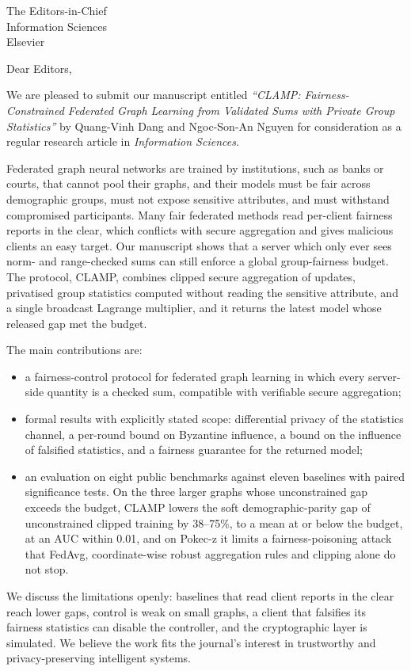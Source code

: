 \documentclass[11pt]{letter}
\date{31 October 2026}
\begin{document}
\begin{letter}{The Editors-in-Chief\\Information Sciences\\Elsevier}

\opening{Dear Editors,}

We are pleased to submit our manuscript entitled \emph{``CLAMP: Fairness-Constrained Federated Graph Learning from Validated Sums with Private Group Statistics''} by Quang-Vinh Dang and Ngoc-Son-An Nguyen for consideration as a regular research article in \emph{Information Sciences}.

Federated graph neural networks are trained by institutions, such as banks or courts, that cannot pool their graphs, and their models must be fair across demographic groups, must not expose sensitive attributes, and must withstand compromised participants. Many fair federated methods read per-client fairness reports in the clear, which conflicts with secure aggregation and gives malicious clients an easy target. Our manuscript shows that a server which only ever sees norm- and range-checked sums can still enforce a global group-fairness budget. The protocol, CLAMP, combines clipped secure aggregation of updates, privatised group statistics computed without reading the sensitive attribute, and a single broadcast Lagrange multiplier, and it returns the latest model whose released gap met the budget.

The main contributions are:
\begin{itemize}
\item a fairness-control protocol for federated graph learning in which every server-side quantity is a checked sum, compatible with verifiable secure aggregation;
\item formal results with explicitly stated scope: differential privacy of the statistics channel, a per-round bound on Byzantine influence, a bound on the influence of falsified statistics, and a fairness guarantee for the returned model;
\item an evaluation on eight public benchmarks against eleven baselines with paired significance tests. On the three larger graphs whose unconstrained gap exceeds the budget, CLAMP lowers the soft demographic-parity gap of unconstrained clipped training by 38--75\%, to a mean at or below the budget, at an AUC within 0.01, and on Pokec-z it limits a fairness-poisoning attack that FedAvg, coordinate-wise robust aggregation rules and clipping alone do not stop.
\end{itemize}
We discuss the limitations openly: baselines that read client reports in the clear reach lower gaps, control is weak on small graphs, a client that falsifies its fairness statistics can disable the controller, and the cryptographic layer is simulated. We believe the work fits the journal's interest in trustworthy and privacy-preserving intelligent systems.


\end{letter}
\end{document}
